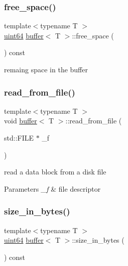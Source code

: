 \subsubsection{\texorpdfstring{free\+\_\+space()}{free\_space()}}
{\footnotesize\ttfamily template$<$typename T $>$ \\
\hyperlink{types_8h_a60e8696a4678cd348e991a1f172e53f7}{uint64} \hyperlink{structbuffer}{buffer}$<$ T $>$\+::free\+\_\+space (\begin{DoxyParamCaption}{ }\end{DoxyParamCaption}) const\hspace{0.3cm}{\ttfamily [inline]}}



remaing space in the buffer 

\mbox{\label{structbuffer_a2abf8fde8a3d6a1245f57d698e207b74}} 
\subsubsection{\texorpdfstring{read\+\_\+from\+\_\+file()}{read\_from\_file()}}
{\footnotesize\ttfamily template$<$typename T $>$ \\
void \hyperlink{structbuffer}{buffer}$<$ T $>$\+::read\+\_\+from\+\_\+file (\begin{DoxyParamCaption}\item[{std\+::\+F\+I\+LE $\ast$}]{\+\_\+f }\end{DoxyParamCaption})\hspace{0.3cm}{\ttfamily [inline]}}



read a data block from a disk file 


\begin{DoxyParams}{Parameters}
{\em \+\_\+f} & file descriptor \\
\hline
\end{DoxyParams}
\mbox{\label{structbuffer_a2b74a935bb50716bba0835781545803d}} 
\subsubsection{\texorpdfstring{size\+\_\+in\+\_\+bytes()}{size\_in\_bytes()}\hspace{0.1cm}{\footnotesize\ttfamily [1/2]}}
{\footnotesize\ttfamily template$<$typename T $>$ \\
\hyperlink{types_8h_a60e8696a4678cd348e991a1f172e53f7}{uint64} \hyperlink{structbuffer}{buffer}$<$ T $>$\+::size\+\_\+in\+\_\+bytes (\begin{DoxyParamCaption}{ }\end{DoxyParamCaption}) const\hspace{0.3cm}{\ttfamily [inline]}}



